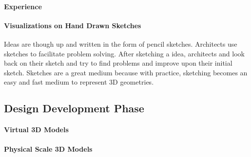     \paragraph{Experience}


    \paragraph{Visualizations on Hand Drawn Sketches}

    Ideas are though up and written in the form of pencil sketches.
    Architects use sketches to facilitate problem solving. 
    After sketching a idea, architects and look back on their sketch and try to find problems and improve upon their initial sketch.
    Sketches are a great medium because with practice, sketching becomes an easy and fast medium to represent 3D geometries\cite{Suwa}.

  \subsection{Design Development Phase}

    \paragraph{Virtual 3D Models}
    \paragraph{Physical Scale 3D Models}

